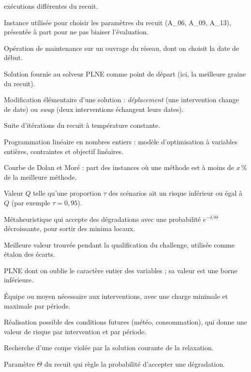\documentclass[11pt,a4paper]{report}
\begin{document}
\begin{description}[style=nextline, leftmargin=1.5em, itemsep=0.35em]
        exécutions différentes du recuit.
  \item[Instance de réglage] Instance utilisée pour choisir les paramètres du recuit (A\_06, A\_09,
        A\_13), présentée à part pour ne pas biaiser l'évaluation.
  \item[Intervention] Opération de maintenance sur un ouvrage du réseau, dont on choisit la date de
        début.
  \item[MIP start] Solution fournie au solveur PLNE comme point de départ (ici, la meilleure graine du
        recuit).
  \item[Mouvement] Modification élémentaire d'une solution : \emph{déplacement} (une intervention
        change de date) ou \emph{swap} (deux interventions échangent leurs dates).
  \item[Palier] Suite d'itérations du recuit à température constante.
  \item[PLNE] Programmation linéaire en nombres entiers : modèle d'optimisation à variables entières,
        contraintes et objectif linéaires.
  \item[Profil de performance] Courbe de Dolan et Moré : part des instances où une méthode est à moins
        de $x$\,\% de la meilleure méthode.
  \item[Quantile] Valeur $Q$ telle qu'une proportion $\tau$ des scénarios ait un risque inférieur ou
        égal à $Q$ (par exemple $\tau = 0{,}95$).
  \item[Recuit simulé] Métaheuristique qui accepte des dégradations avec une probabilité
        $e^{-\delta/\Theta}$ décroissante, pour sortir des minima locaux.
  \item[Référence] Meilleure valeur trouvée pendant la qualification du challenge, utilisée comme
        étalon des écarts.
  \item[Relaxation linéaire] PLNE dont on oublie le caractère entier des variables ; sa valeur est une
        borne inférieure.
  \item[Ressource] Équipe ou moyen nécessaire aux interventions, avec une charge minimale et maximale
        par période.
  \item[Scénario] Réalisation possible des conditions futures (météo, consommation), qui donne une
        valeur de risque par intervention et par période.
  \item[Séparation] Recherche d'une coupe violée par la solution courante de la relaxation.
  \item[Température] Paramètre $\Theta$ du recuit qui règle la probabilité d'accepter une dégradation.
\end{description}
\end{document}
